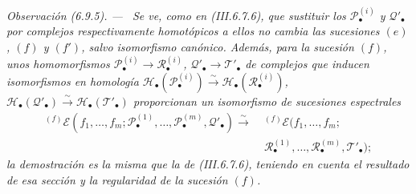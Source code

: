 \documentclass[10pt,oneside]{book}
\newcommand{\sref}[2][]{\textup{(#2)}}
\newenvironment{remark}[1][]{\par\medskip\noindent\itshape Observación (#1). ---\ }{\par}
\begin{document}
\begin{remark}[6.9.5]
\label{III.6.9.5}
Se ve, como en \sref{III.6.7.6}, que sustituir los
$\mathscr P_\bullet^{(i)}$ y $\mathscr Q'_\bullet$ por complejos
respectivamente \emph{homotópicos} a ellos no cambia las sucesiones $(e)$, $(f)$ y
$(f')$, salvo isomorfismo canónico. Además, para la sucesión $(f)$, unos
homomorfismos
$\mathscr P_\bullet^{(i)}\to\mathscr R_\bullet^{(i)}$,
$\mathscr Q'_\bullet\to\mathscr T'_\bullet$ de complejos que inducen
isomorfismos en homología
$\mathscr H_\bullet(\mathscr P_\bullet^{(i)})\xrightarrow{\sim}
\mathscr H_\bullet(\mathscr R_\bullet^{(i)})$,
$\mathscr H_\bullet(\mathscr Q'_\bullet)\xrightarrow{\sim}
\mathscr H_\bullet(\mathscr T'_\bullet)$ proporcionan un isomorfismo de
sucesiones espectrales
\[
\begin{split}
  {}^{(f)}\mathscr E
  (f_1,\ldots,f_m;
   \mathscr P_\bullet^{(1)},\ldots,\mathscr P_\bullet^{(m)},
   \mathscr Q'_\bullet)
  \xrightarrow{\sim}\;&
  {}^{(f)}\mathscr E
  (f_1,\ldots,f_m;\\
  &\mathscr R_\bullet^{(1)},\ldots,\mathscr R_\bullet^{(m)},
   \mathscr T'_\bullet);
\end{split}
\]
la demostración es la misma que la de \sref{III.6.7.6}, teniendo en cuenta
el resultado de esa sección y la regularidad de la sucesión $(f)$.
\end{remark}
\end{document}
